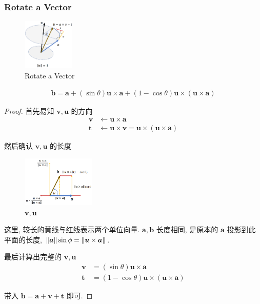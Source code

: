 \subsubsection{Rotate a Vector}
\begin{figure}[!htb]
    \centering
    \includegraphics[width=0.22\textwidth]{pic/1052/Rotate a Vector}
    \caption{Rotate a Vector}
\end{figure}

\begin{align*}
    \bm b = \bm a + (\sin\theta)\bm u \times \bm a + (1-\cos\theta)\bm u \times(\bm u \times \bm a )
\end{align*}

\begin{proof}
    首先易知 $\bm v, \bm u$ 的方向
    \begin{align*}
        \bm v &\leftarrow \bm u \times \bm a\\
        \bm t &\leftarrow \bm u \times \bm v=\bm u \times (\bm u \times \bm a)
    \end{align*}

    然后确认 $\bm v, \bm u$ 的长度
    \begin{figure}[H]
        \centering
        \includegraphics[width=0.309\textwidth]{pic/1052/uv.png}
        \caption{$\bm v, \bm u$}
    \end{figure}
    这里, 较长的黄线与红线表示两个单位向量. $\bm a, \bm b$ 长度相同, 是原本的 $\bm a$ 投影到此平面的长度, $\left\lVert\bm a\right\rVert\sin \phi =\left\lVert\bm u \times \bm a\right\rVert$. 

    最后计算出完整的 $\bm v, \bm u$
    \begin{align*}
        \bm v &=(\sin\theta) \bm u \times \bm a\\
        \bm t &=(1-\cos\theta)\bm u \times (\bm u \times \bm a)
    \end{align*}
    
    带入 $\bm b = \bm a +\bm v +\bm t$ 即可.
\end{proof}

